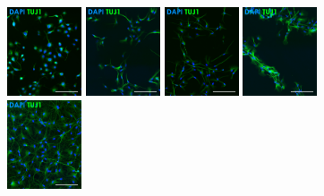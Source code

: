 \documentclass[onecolumn,10pt]{asme2ej}
\begin{document}
\begin{figure}[h]
	\includegraphics[width=0.196\textwidth]{figures/IF/charac(light)/d0-t}
	\includegraphics[width=0.196\textwidth]{figures/IF/charac(light)/d3-t}	\includegraphics[width=0.196\textwidth]{figures/IF/charac(light)/d7-t}	\includegraphics[width=0.196\textwidth]{figures/IF/charac(light)/d14-t}	\includegraphics[width=0.196\textwidth]{figures/IF/charac(light)/d21-t}
	

\end{figure}
\end{document}
